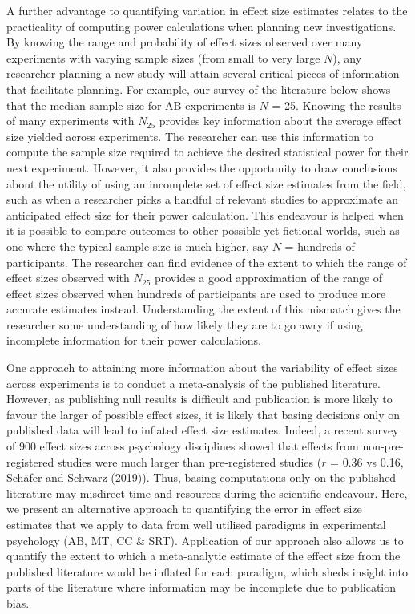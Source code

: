 \documentclass{article}
\begin{document}
A further advantage to quantifying variation in effect size estimates relates to the practicality of computing power calculations when planning new investigations. By knowing the range and probability of effect sizes observed over many experiments with varying sample sizes (from small to very large \(N\)), any researcher planning a new study will attain several critical pieces of information that facilitate planning. For example, our survey of the literature below shows that the median sample size for AB experiments is \(N\) = 25. Knowing the results of many experiments with \(N_{25}\) provides key information about the average effect size yielded across experiments. The researcher can use this information to compute the sample size required to achieve the desired statistical power for their next experiment. However, it also provides the opportunity to draw conclusions about the utility of using an incomplete set of effect size estimates from the field, such as when a researcher picks a handful of relevant studies to approximate an anticipated effect size for their power calculation. This endeavour is helped when it is possible to compare outcomes to other possible yet fictional worlds, such as one where the typical sample size is much higher, say \(N\) = hundreds of participants. The researcher can find evidence of the extent to which the range of effect sizes observed with \(N_{25}\) provides a good approximation of the range of effect sizes observed when hundreds of participants are used to produce more accurate estimates instead. Understanding the extent of this mismatch gives the researcher some understanding of how likely they are to go awry if using incomplete information for their power calculations.

One approach to attaining more information about the variability of effect sizes across experiments is to conduct a meta-analysis of the published literature. However, as publishing null results is difficult and publication is more likely to favour the larger of possible effect sizes, it is likely that basing decisions only on published data will lead to inflated effect size estimates. Indeed, a recent survey of 900 effect sizes across psychology disciplines showed that effects from non-pre-registered studies were much larger than pre-registered studies (\(r\) = 0.36 vs 0.16, Schäfer and Schwarz (2019)). Thus, basing computations only on the published literature may misdirect time and resources during the scientific endeavour. Here, we present an alternative approach to quantifying the error in effect size estimates that we apply to data from well utilised paradigms in experimental psychology (AB, MT, CC \& SRT). Application of our approach also allows us to quantify the extent to which a meta-analytic estimate of the effect size from the published literature would be inflated for each paradigm, which sheds insight into parts of the literature where information may be incomplete due to publication bias.
\end{document}
